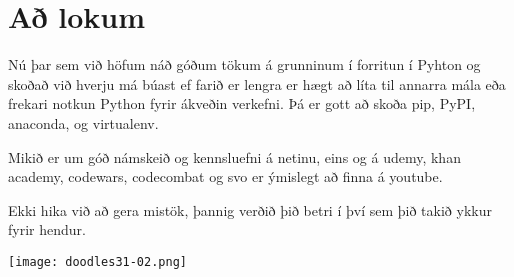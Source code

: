 \section{Að lokum}\label{Að lokum}

Nú þar sem við höfum náð góðum tökum á grunninum í forritun í Pyhton og skoðað við hverju má búast ef farið er lengra er hægt að líta til annarra mála eða frekari notkun Python fyrir ákveðin verkefni.
Þá er gott að skoða pip, PyPI, anaconda, og virtualenv.

Mikið er um góð námskeið og kennsluefni á netinu, eins og á udemy, khan academy, codewars, codecombat og svo er ýmislegt að finna á youtube.

Ekki hika við að gera mistök, þannig verðið þið betri í því sem þið takið ykkur fyrir hendur. 

	\begin{center}
		\texttt{[image: doodles31-02.png]}
	\end{center}